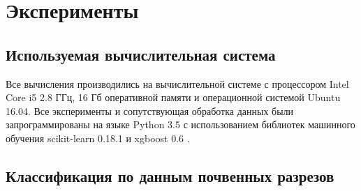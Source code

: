 \documentclass[14pt]{extarticle}
\begin{document}
\section{Эксперименты}

\subsection{Используемая вычислительная система}

Все вычисления производились на вычислительной системе с процессором Intel Core i5 2.8 ГГц,
16 Гб оперативной памяти и операционной системой Ubuntu 16.04. Все эксперименты и
сопутствующая обработка данных были запрограммированы на языке Python 3.5 
\cite{python} с использованием
библиотек машинного обучения scikit-learn 0.18.1 \cite{sklearn} и 
xgboost 0.6 \cite{xgboost}.

\subsection{Классификация по данным почвенных разрезов}
\end{document}
